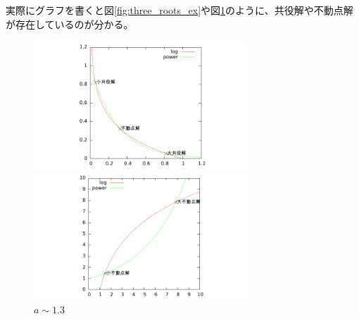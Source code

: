 	実際にグラフを書くと図\ref{fig:three_roots_ex}や図\ref{fig:two_roots_ex}のように、共役解や不動点解が存在しているのが分かる。
	\begin{figure}[hbtp]
	\begin{minipage}{0.5\hsize}
		\includegraphics[width=80mm]{../plot/graph/three_roots_ex.pdf}
		\caption{$a \sim 0.03$}
		\label{fig:three_roots_ex}
	\end{minipage}
	\begin{minipage}{0.5\hsize}
		\includegraphics[width=80mm]{../plot/graph/two_roots_ex.pdf}
		\caption{$a \sim 1.3$}
		\label{fig:two_roots_ex}
	\end{minipage}
	\end{figure}
	
	

